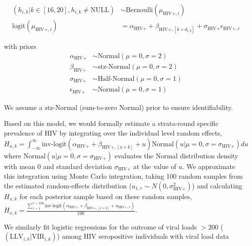 \documentclass{article}[11pt]
\begin{document}
\begin{equation}
\begin{split}
(h_{i,k} | k \in [16, 20], h_{i,k} \neq \text{NULL}) &\sim \text{Bernoulli}(\mu_{\text{HIV+},i}) \\
\text{logit}(\mu_{\text{HIV+},i}) &= \alpha_{\text{HIV+}} + \beta_{\text{HIV+},[k \times d_{i,k}]} + \sigma_\text{HIV+}\epsilon_{\text{HIV+},i} 
\end{split}
\end{equation}

with priors 
\begin{equation}
\begin{split}
\alpha_{\text{HIV+}} &\sim \text{Normal}(\mu=0,\sigma=2) \\
\beta_{\text{HIV+}} &\sim \text{stz-Normal}(\mu=0,\sigma=2) \\
\sigma_{\text{HIV+}} &\sim \text{Half-Normal}(\mu=0,\sigma=1)\\
\epsilon_{\text{HIV+}} &\sim \text{Normal}(\mu=0,\sigma=1) 
\end{split}
\end{equation}

We assume a $\text{stz-Normal}$ (sum-to-zero Normal) prior to ensure identifiability.

Based on this model, we would formally estimate a strata-round specific prevalence of HIV by integrating over the individual level random effects, $H_{x,k} = \int_{-\infty}^\infty\text{inv-logit}\left(\alpha_{\text{HIV+}} + \beta_{{\text{HIV+}},[x\times k]} + u\right)\text{Normal}(u | \mu=0,\sigma=\sigma_{\text{HIV+}})du$ where $\text{Normal}(u | \mu=0,\sigma=\sigma_{\text{HIV+}})$ evaluates the Normal distribution density with mean 0 and standard deviation $\sigma_{\text{HIV+}}$ at the value of $u$. We approximate this integration using Monte Carlo integration, taking 100 random samples from the estimated random-effects distribution ($u_{1,r} \sim N(0, \sigma_{\text{HIV+}}^2)$) and calculating $H_{x,k}$ for each posterior sample based on these random samples, $H_{x,k} = \frac{\sum_{r=1}^{r=100}\text{inv-logit}\left(\alpha_{\text{HIV+}} + \beta_{{\text{HIV+}},[x\times k]} + u_{{\text{HIV+}},r}\right)}{100}$.

We similarly fit logistic regressions for the outcome of viral loads $>200$ ($(\text{LLV}_{i,k}|\text{VIR}_{i,k})$) among HIV seropositive individuals with viral load data 
\end{document}
